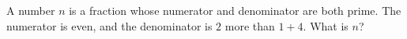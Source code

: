 A number $n$ is a fraction whose numerator and denominator are both prime. The numerator is even, and the denominator is $2$ more than $1+4$. What is $n$?
